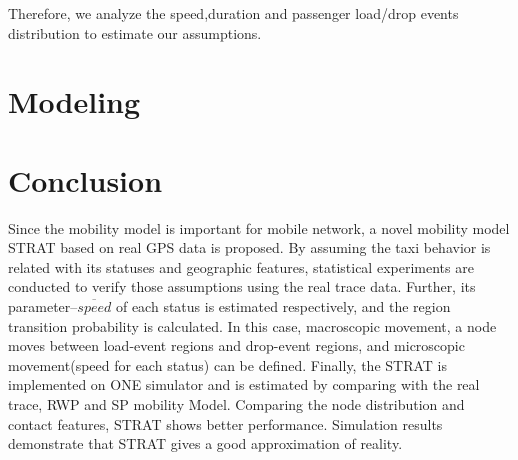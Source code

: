 \documentclass[camera-ready,twocolumn,10pt]{IEEEtran}
\begin{document}
   Therefore, we analyze the speed,duration and passenger load/drop events distribution to estimate our assumptions.








\section{Modeling}
\label{section_modeling}








\section{Conclusion}
\label{section_conclusion}
Since the mobility model is important for mobile network, a novel mobility model STRAT based on real GPS data is proposed. By assuming the taxi behavior is related with its statuses and geographic features, statistical experiments are conducted to verify those assumptions using the real trace data. Further, its parameter--$\overline{speed}$ of each status is estimated respectively, and the region transition probability is calculated. In this case, macroscopic movement, a node moves between load-event regions and drop-event regions, and microscopic movement(speed for each status) can be defined. Finally, the STRAT is implemented on ONE simulator and is estimated by comparing with the real trace, RWP and SP mobility Model.
Comparing the node distribution and contact features, STRAT shows better performance.
Simulation results demonstrate that STRAT gives a good approximation of reality.






\end{document}
